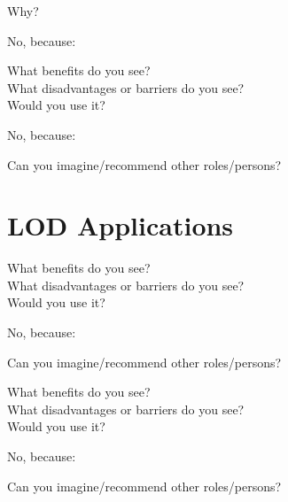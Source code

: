 \documentclass[12pt,fleqn]{scrreprt}
\begin{document}
\newpage

{}
Why?
\opentwo

\begin{answersA}
\item {}
\item No, because:
\end{answersA}
\opentwo
What benefits do you see?\\
\opentwo
What disadvantages or barriers do you see?\\
\opentwo
Would you use it?\\
\begin{answersA}
\item {}
\item No, because:
\end{answersA}
\opentwo
Can you imagine/recommend other roles/persons?\\
\opentwo

\newpage

\section*{LOD Applications}

\openfour
What benefits do you see?\\
\opentwo
What disadvantages or barriers do you see?\\
\opentwo
Would you use it?\\
\begin{answersA}
\item {}
\item No, because:
\end{answersA}
\opentwo
Can you imagine/recommend other roles/persons?\\
\opentwo
\newpage

\openfour
What benefits do you see?\\
\opentwo
What disadvantages or barriers do you see?\\
\opentwo
Would you use it?\\
\begin{answersA}
\item {}
\item No, because:
\end{answersA}
\opentwo
Can you imagine/recommend other roles/persons?\\
\opentwo
\newpage
\end{document}
